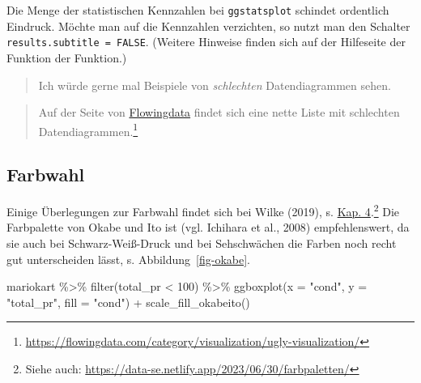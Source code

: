 \documentclass[
  letterpaper,
]{scrbook}
\newenvironment{Shaded}{\begin{snugshade}}{\end{snugshade}}
\newcommand{\AttributeTok}[1]{\textcolor[rgb]{0.40,0.45,0.13}{#1}}
\newcommand{\DecValTok}[1]{\textcolor[rgb]{0.68,0.00,0.00}{#1}}
\newcommand{\FunctionTok}[1]{\textcolor[rgb]{0.28,0.35,0.67}{#1}}
\newcommand{\NormalTok}[1]{\textcolor[rgb]{0.00,0.23,0.31}{#1}}
\newcommand{\SpecialCharTok}[1]{\textcolor[rgb]{0.37,0.37,0.37}{#1}}
\newcommand{\StringTok}[1]{\textcolor[rgb]{0.13,0.47,0.30}{#1}}
\theoremstyle{definition}
\theoremstyle{definition}
\theoremstyle{definition}
\theoremstyle{remark}
\begin{document}
Die Menge der statistischen Kennzahlen bei \texttt{ggstatsplot} schindet
ordentlich Eindruck. Möchte man auf die Kennzahlen verzichten, so nutzt
man den Schalter \texttt{results.subtitle\ =\ FALSE}. (Weitere Hinweise
finden sich auf der Hilfeseite der Funktion der Funktion.)

\begin{quote}
{} Ich würde gerne mal Beispiele von \emph{schlechten}
Datendiagrammen sehen.
\end{quote}

\begin{quote}
{} Auf der Seite von
\href{https://flowingdata.com/category/visualization/ugly-visualization/}{Flowingdata}
findet sich eine nette Liste mit schlechten Datendiagrammen.\footnote{\url{https://flowingdata.com/category/visualization/ugly-visualization/}}
\end{quote}

\subsection{Farbwahl}\label{sec-farbwahl}

Einige Überlegungen zur Farbwahl findet sich bei Wilke (2019), s.
\href{https://clauswilke.com/dataviz/color-basics.html}{Kap.
4}.\footnote{Siehe auch:
  \url{https://data-se.netlify.app/2023/06/30/farbpaletten/}} Die
Farbpalette von Okabe und Ito ist (vgl. Ichihara et al., 2008)
empfehlenswert, da sie auch bei Schwarz-Weiß-Druck und bei Sehschwächen
die Farben noch recht gut unterscheiden lässt, s.
Abbildung~\ref{fig-okabe}.

\begin{Shaded}
\begin{Highlighting}[]
\NormalTok{mariokart }\SpecialCharTok{\%\textgreater{}\%} 
  \FunctionTok{filter}\NormalTok{(total\_pr }\SpecialCharTok{\textless{}} \DecValTok{100}\NormalTok{) }\SpecialCharTok{\%\textgreater{}\%} 
  \FunctionTok{ggboxplot}\NormalTok{(}\AttributeTok{x =} \StringTok{"cond"}\NormalTok{, }\AttributeTok{y =} \StringTok{"total\_pr"}\NormalTok{, }\AttributeTok{fill =} \StringTok{"cond"}\NormalTok{) }\SpecialCharTok{+}
  \FunctionTok{scale\_fill\_okabeito}\NormalTok{()}
\end{Highlighting}
\end{Shaded}
\end{document}
